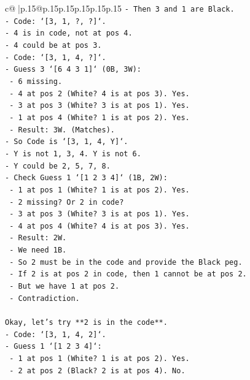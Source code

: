 \documentclass{article}
\begin{document}
{\begin{supertabular}{c@{$\;$}|p{.15\linewidth}@{}p{.15\linewidth}p{.15\linewidth}p{.15\linewidth}p{.15\linewidth}p{.15\linewidth}}
{{{\texttt{{-} Then 3 and 1 are Black.} \\
\texttt{{-} Code: `{[}3, 1, ?, ?{]}`.} \\
\texttt{{-} 4 is in code, not at pos 4.} \\
\texttt{{-} 4 could be at pos 3.} \\
\texttt{{-} Code: `{[}3, 1, 4, ?{]}`.} \\
\texttt{{-} Guess 3 `{[}6 4 3 1{]}` (0B, 3W):} \\
\texttt{  {-} 6 missing.} \\
\texttt{  {-} 4 at pos 2 (White? 4 is at pos 3). Yes.} \\
\texttt{  {-} 3 at pos 3 (White? 3 is at pos 1). Yes.} \\
\texttt{  {-} 1 at pos 4 (White? 1 is at pos 2). Yes.} \\
\texttt{  {-} Result: 3W. (Matches).} \\
\texttt{{-} So Code is `{[}3, 1, 4, Y{]}`.} \\
\texttt{{-} Y is not 1, 3, 4. Y is not 6.} \\
\texttt{{-} Y could be 2, 5, 7, 8.} \\
\texttt{{-} Check Guess 1 `{[}1 2 3 4{]}` (1B, 2W):} \\
\texttt{  {-} 1 at pos 1 (White? 1 is at pos 2). Yes.} \\
\texttt{  {-} 2 missing? Or 2 in code?} \\
\texttt{  {-} 3 at pos 3 (White? 3 is at pos 1). Yes.} \\
\texttt{  {-} 4 at pos 4 (White? 4 is at pos 3). Yes.} \\
\texttt{  {-} Result: 2W.} \\
\texttt{  {-} We need 1B.} \\
\texttt{  {-} So 2 must be in the code and provide the Black peg.} \\
\texttt{  {-} If 2 is at pos 2 in code, then 1 cannot be at pos 2.} \\
\texttt{  {-} But we have 1 at pos 2.} \\
\texttt{  {-} Contradiction.} \\
\\ 
\texttt{Okay, let's try **2 is in the code**.} \\
\texttt{{-} Code: `{[}3, 1, 4, 2{]}`.} \\
\texttt{{-} Guess 1 `{[}1 2 3 4{]}`:} \\
\texttt{  {-} 1 at pos 1 (White? 1 is at pos 2). Yes.} \\
\texttt{  {-} 2 at pos 2 (Black? 2 is at pos 4). No.} \\
}}}
\end{supertabular}}
\end{document}

